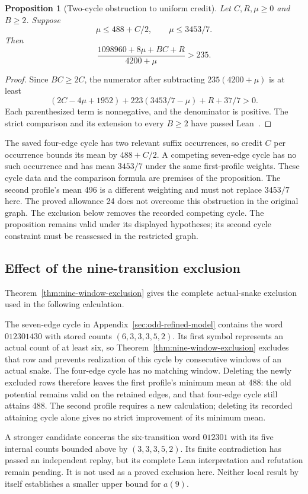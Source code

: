 \documentclass[11pt,a4paper]{article}
\newtheorem{proposition}[theorem]{Proposition}
\theoremstyle{definition}
\theoremstyle{remark}
\begin{document}
\begin{proposition}[Two-cycle obstruction to uniform credit]\label{prop:uniform-occurrence-credit}
Let $C,R,\mu\ge0$ and $B\ge2$. Suppose
\[
\mu\le488+C/2,\qquad \mu\le3453/7.
\]
Then
\[
\frac{1098960+8\mu+BC+R}{4200+\mu}>235.
\]
\end{proposition}
\begin{proof}
Since $BC\ge2C$, the numerator after subtracting $235(4200+\mu)$ is
at least
\[
(2C-4\mu+1952)+223(3453/7-\mu)+R+37/7>0.
\]
Each parenthesized term is nonnegative, and the denominator is positive.
The strict comparison and its extension to every $B\ge2$ have passed
Lean~\cite{lowpairarchive}.
\end{proof}
The saved four-edge cycle has two relevant suffix occurrences, so credit
$C$ per occurrence bounds its mean by $488+C/2$. A competing seven-edge
cycle has no such occurrence and has mean $3453/7$ under the same
first-profile weights. These cycle data and the comparison formula are
premises of the proposition. The second profile's mean 496 is a different
weighting and must not replace $3453/7$ here. The proved allowance 24 does not overcome this obstruction in the original
graph. The exclusion below removes the recorded competing cycle. The
proposition remains valid under its displayed hypotheses; its second cycle
constraint must be reassessed in the restricted graph.


\subsection{Effect of the nine-transition exclusion}
Theorem~\ref{thm:nine-window-exclusion} gives the complete actual-snake
exclusion used in the following calculation.

The seven-edge cycle in Appendix~\ref{sec:odd-refined-model} contains the
word $012301430$ with stored counts $(6,3,3,3,5,2)$. Its first symbol
represents an actual count of at least six, so Theorem~\ref{thm:nine-window-exclusion}
excludes that row and prevents realization of this cycle by consecutive
windows of an actual snake. The four-edge cycle has no matching window.
Deleting the newly excluded rows therefore leaves the first profile's
minimum mean at 488: the old potential remains valid on the retained edges,
and that four-edge cycle still attains 488. The second profile requires a
new calculation; deleting its recorded attaining cycle alone gives no
strict improvement of its minimum mean.

A stronger candidate concerns the six-transition word $012301$ with its
five internal counts bounded above by $(3,3,3,5,2)$. Its finite contradiction
has passed an independent replay, but its complete Lean interpretation and
refutation remain pending. It is not used as a proved exclusion here.
Neither local result by itself establishes a smaller upper bound for $a(9)$.
\end{document}
